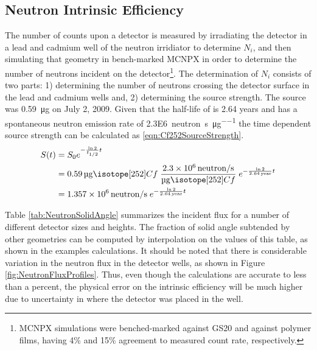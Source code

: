 \subsection{Neutron Intrinsic Efficiency}
The number of counts upon a detector is measured by irradiating the detector in a lead and cadmium well of the neutron irridiator to determine $N_i$, and then simulating that geometry in bench-marked MCNPX in order to determine the number of neutrons incident on the detector\footnote{MCNPX simulations were benched-marked against GS20 and against polymer films, having 4\% and 15\% agreement to measured count rate, respectively.}.
The determination of $N_i$ consists of two parts: 1) determining the number of neutrons crossing the detector surface in the lead and cadmium wells and, 2) determining the source strength.
The  source was \SI{0.59}{\ug} on July 2, 2009.
Given that the half-life of  is 2.64 years and  has a spontaneous neutron emission rate of \SI{2.3E6}{neutron\per\second\per\micro\gram} the time dependent source strength can be calculated as \eqref{eqn:Cf252SourceStrength}.
\begin{align}
  \label{eqn:Cf252SourceStrength}
  S(t) &= S_0 e^{-\frac{\ln{2}}{t_{1/2}} t} \\ \notag 
    &= \SI{0.59}{\ug} \iso[252]{Cf} \;\frac{\SI{2.3E6}{neutron\per\second}}{\si{\ug} \iso[252]{Cf}}\; e^{-\frac{ \ln{2}}{\SI{2.64}{year}}t}  \\ \notag
    &= \SI{1.357E6}{neutron\per\second}\; e^{-\frac{ \ln{2}}{\SI{2.64}{year}}t} 
\end{align}

Table \ref{tab:NeutronSolidAngle} summarizes the incident flux for a number of different detector sizes and heights.
The fraction of solid angle subtended by other geometries can be computed by interpolation on the values of this table, as shown in the examples calculations.
It should be noted that there is considerable variation in the neutron flux in the detector wells, as shown in Figure \ref{fig:NeutronFluxProfiles}.
Thus, even though the calculations are accurate to less than a percent, the physical error on the intrinsic efficiency will be much higher due to uncertainty in where the detector was placed in the well.

